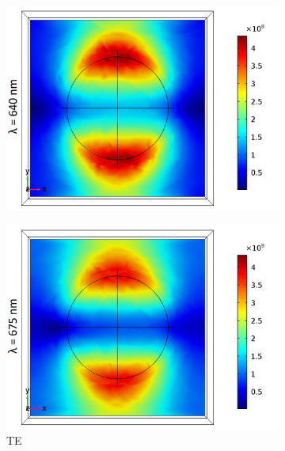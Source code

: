 \begin{figure}[htb!]
    \begin{subfigure}{0.32\textwidth}
        \centering
        \includegraphics[width=\linewidth]{figures/ch4/S5A/FieldDistribution/LSPR/Sample5A_TE_Slice@z=-05t_wl=640_notitle.png}
   \end{subfigure}
   \begin{subfigure}{0.32\textwidth}
        \centering
        \includegraphics[width=\linewidth]{figures/ch4/S5A/FieldDistribution/LSPR/Sample5A_TE_Slice@z=-05t_wl=675_notitle.png}
        \caption{TE}
        \vspace{-0.7cm}
   \end{subfigure}
   \begin{subfigure}{0.32\textwidth}

\end{subfigure}
\end{figure}
